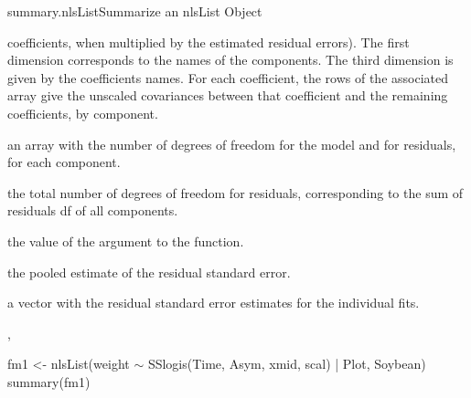 \documentclass[pdftex]{article} \usepackage{url,graphicx}
\renewcommand{\Twiddle}{\mbox{\(\sim\)}}
\begin{document}
\begin{Helpfile}{summary.nlsList}{Summarize an nlsList Object}
\begin{Argument}{}
coefficients, when multiplied by the estimated residual errors). The
first dimension corresponds to the names of the 
components. The third dimension is given by the
coefficients names. For each coefficient, the rows of the associated
array give the unscaled covariances between that coefficient and the
remaining coefficients, by  component.
\item[\Co{df:}]
an array with the number of degrees of freedom for the model
and for residuals, for each  component.
\item[\Co{df.residual:}]
the total number of degrees of freedom for
residuals, corresponding to the sum of residuals df of all 
components.
\item[\Co{pool:}]
the value of the  argument to the function.
\item[\Co{RSE:}]
the pooled estimate of the residual standard error.
\item[\Co{sigma:}]
a vector with the residual standard error estimates for
the individual  fits.
\end{Argument}
, 
\need 15pt
\vspace{-16pt}
\begin{Example}
fm1 <- nlsList(weight {\Twiddle} SSlogis(Time, Asym, xmid, scal) | Plot, 
               Soybean)
summary(fm1)
\end{Example}
\end{Helpfile}
\end{document}
